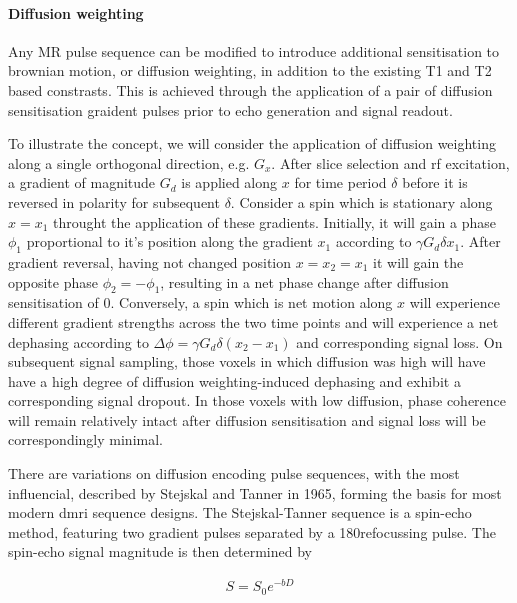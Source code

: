 \paragraph*{Diffusion weighting}

Any MR pulse sequence can be modified to introduce additional sensitisation to brownian motion, or diffusion weighting, in addition to the existing T1 and T2 based constrasts.
This is achieved through the application of a pair of diffusion sensitisation graident pulses prior to echo generation and signal readout.

To illustrate the concept, we will consider the application of diffusion weighting along a single orthogonal direction, e.g. $G_x$.
After slice selection and \gls{rf} excitation, a gradient of magnitude $G_d$ is applied along $x$ for time period $\delta$ before it is reversed in polarity for subsequent $\delta$.
Consider a spin which is stationary along $x=x_1$ throught the application of these gradients.
Initially, it will gain a phase $\phi_1$ proportional to it's position along the gradient $x_1$ according to $\gamma G_d \delta x_1$.
After gradient reversal, having not changed position $x=x_2=x_1$ it will gain the opposite phase $\phi_2 = -\phi_1$, resulting in a net phase change after diffusion sensitisation of $0$.
Conversely, a spin which is net motion along $x$ will experience different gradient strengths across the two time points and will experience a net dephasing according to $\Delta\phi = \gamma G_d \delta (x_2 - x_1)$  and corresponding signal loss.
On subsequent signal sampling, those voxels in which diffusion was high will have have a high degree of diffusion weighting-induced dephasing and exhibit a corresponding signal dropout.
In those voxels with low diffusion, phase coherence will remain relatively intact after diffusion sensitisation and signal loss will be correspondingly minimal.

There are variations on diffusion encoding pulse sequences, with the most influencial, described by Stejskal and Tanner  in 1965, forming the basis for most modern \gls{dmri} sequence designs.
The Stejskal-Tanner sequence is a spin-echo method, featuring two gradient pulses separated by a 180\textdegree refocussing pulse.
The spin-echo signal magnitude is then determined by

\begin{align}
    S = S_0e^{-bD}
\end{align}\label{eq:S}

